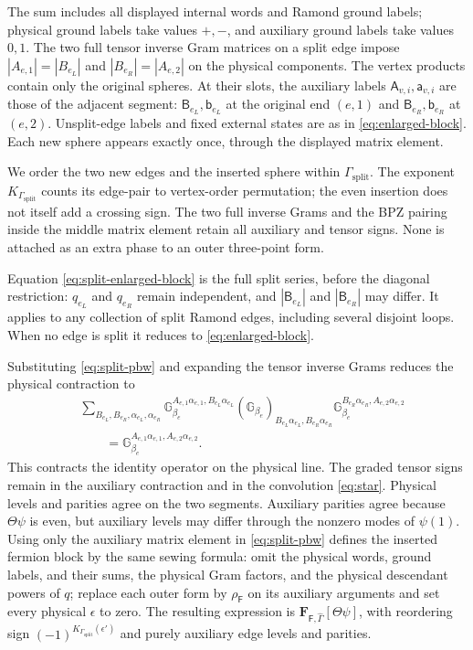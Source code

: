 \documentclass[11pt]{article}
\newcommand{\F}{\mathsf F}
\numberwithin{equation}{section}
\begin{document}
The sum includes all displayed internal words and Ramond ground labels;
physical ground labels take values $+,-$, and auxiliary ground labels
take values $0,1$. The two full tensor inverse Gram matrices on a
split edge impose $|A_{e,1}|=|B_{e_L}|$ and
$|B_{e_R}|=|A_{e,2}|$ on the physical components.
The vertex products contain only the original spheres. At their slots,
the auxiliary labels $\mathsf A_{v,i},\mathsf a_{v,i}$ are those of
the adjacent segment: $\mathsf B_{e_L},\mathsf b_{e_L}$ at the original
end $(e,1)$ and $\mathsf B_{e_R},\mathsf b_{e_R}$ at $(e,2)$.
Unsplit-edge labels and fixed external states are as in
\eqref{eq:enlarged-block}. Each new sphere appears exactly once, through
the displayed matrix element.

We order the two new edges and the inserted sphere within
$\Gamma_{\mathrm{split}}$. The exponent
$K_{\Gamma_{\mathrm{split}}}$ counts its edge-pair to vertex-order
permutation; the even insertion does not itself add a crossing sign.
The two full inverse Grams and the BPZ pairing inside the middle
matrix element retain all auxiliary and tensor signs. None is
attached as an extra phase to an outer three-point form.

Equation \eqref{eq:split-enlarged-block} is the full split series, before
the diagonal restriction: $q_{e_L}$ and $q_{e_R}$ remain independent,
and $|\mathsf B_{e_L}|$ and $|\mathsf B_{e_R}|$ may differ. It applies
to any collection of split Ramond edges, including several disjoint
loops. When no edge is split it reduces to \eqref{eq:enlarged-block}.

Substituting \eqref{eq:split-pbw} and expanding the tensor inverse
Grams reduces the physical contraction to
\begin{align}
 &\sum_{B_{e_L},B_{e_R},\alpha_{e_L},\alpha_{e_R}}
 \mathbb G_{\beta_e}^{A_{e,1}\alpha_{e,1},B_{e_L}\alpha_{e_L}}
 (\mathbb G_{\beta_e})_{B_{e_L}\alpha_{e_L},B_{e_R}\alpha_{e_R}}
 \mathbb G_{\beta_e}^{B_{e_R}\alpha_{e_R},A_{e,2}\alpha_{e,2}}
 \nonumber\\
 &\qquad=\mathbb G_{\beta_e}^{A_{e,1}\alpha_{e,1},A_{e,2}\alpha_{e,2}}.
 \label{eq:split-gram}
\end{align}
This contracts the identity operator on the physical line. The
graded tensor signs remain in the auxiliary contraction and in
the convolution \eqref{eq:star}. Physical levels and parities agree
on the two segments. Auxiliary parities agree because
$\Theta\psi$ is even, but auxiliary levels may differ through the
nonzero modes of $\psi(1)$. Using only the auxiliary matrix element in
\eqref{eq:split-pbw} defines the inserted fermion block by the same
sewing formula: omit the physical words, ground labels, and their sums,
the physical Gram factors, and the physical descendant powers of $q$;
replace each outer form by $\rho_{\F}$ on its auxiliary arguments and
set every physical $\epsilon$ to zero. The resulting expression is
$\mathbf F_{\F,\hat\Gamma}[\Theta\psi]$, with reordering sign
$(-1)^{K_{\Gamma_{\mathrm{split}}}(\epsilon')}$ and purely auxiliary
edge levels and parities.
\end{document}
